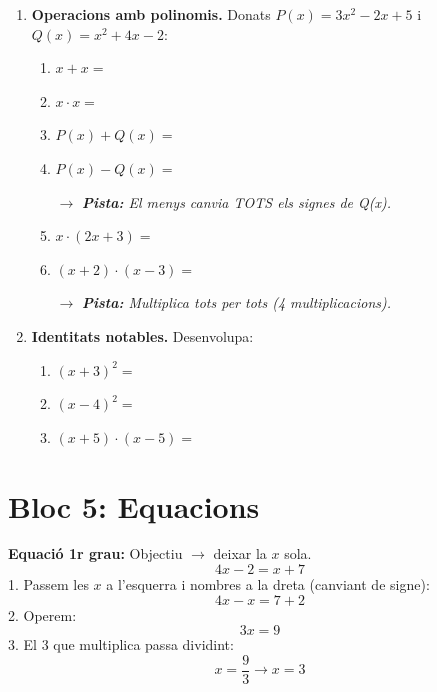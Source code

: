 \documentclass[12pt,a4paper]{article}
\newcommand{\pista}[1]{
    \par\vspace{2pt}
    {\small \color{blue!70!black} $\rightarrow$ \textit{\textbf{Pista:} #1}}
}
\begin{document}
\begin{enumerate}[resume]
    \item \textbf{Operacions amb polinomis.} Donats $P(x) = 3x^2 - 2x + 5$ i $Q(x) = x^2 + 4x - 2$:
    \begin{enumerate}
        \item $x + x =$
        \item $x \cdot x =$
        \item $P(x) + Q(x) =$
        \item $P(x) - Q(x) =$ \pista{El menys canvia TOTS els signes de Q(x).}
        \item $x \cdot (2x + 3) =$
        \item $(x + 2) \cdot (x - 3) =$ \pista{Multiplica tots per tots (4 multiplicacions).}
    \end{enumerate}

    \item \textbf{Identitats notables.} Desenvolupa:
    \begin{enumerate}
        \item $(x + 3)^2 =$
        \item $(x - 4)^2 =$
        \item $(x + 5) \cdot (x - 5) =$
    \end{enumerate}
\end{enumerate}
\newpage
\section*{Bloc 5: Equacions}

\begin{exemple}
\textbf{Equació 1r grau:} Objectiu $\to$ deixar la $x$ sola.
$$ 4x - 2 = x + 7 $$
1. Passem les $x$ a l'esquerra i nombres a la dreta (canviant de signe):
$$ 4x - x = 7 + 2 $$
2. Operem:
$$ 3x = 9 $$
3. El 3 que multiplica passa dividint:
$$ x = \frac{9}{3} \rightarrow x = 3 $$
\end{exemple}
\end{document}
